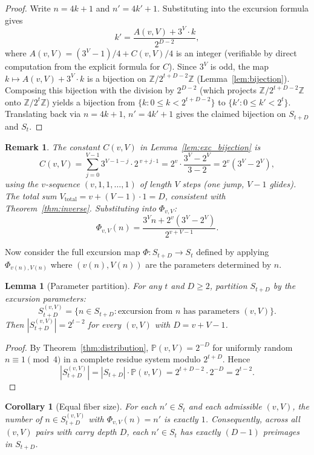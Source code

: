 \documentclass[12pt,a4paper]{article}
\newtheorem{lemma}[theorem]{Lemma}
\newtheorem{corollary}[theorem]{Corollary}
\newtheorem{remark}[theorem]{Remark}
\newcommand{\Prob}{\mathbb{P}}
\newcommand{\Z}{\mathbb{Z}}
\begin{document}
\begin{proof}
Write $n = 4k+1$ and $n' = 4k'+1$. Substituting into the excursion formula gives
\[
k' = \frac{A(v,V) + 3^V \cdot k}{2^{D-2}},
\]
where $A(v,V) = (3^V -1)/4 + C(v,V)/4$ is an integer (verifiable by direct computation from the explicit formula for $C$). Since $3^V$ is odd, the map $k \mapsto A(v,V) + 3^V \cdot k$ is a bijection on $\Z/2^{t+D-2}\Z$ (Lemma~\ref{lem:bijection}). Composing this bijection with the division by $2^{D-2}$ (which projects $\Z/2^{t+D-2}\Z$ onto $\Z/2^t\Z$) yields a bijection from $\{k: 0 \le k < 2^{t+D-2}\}$ to $\{k': 0 \le k' < 2^t\}$. Translating back via $n = 4k+1$, $n' = 4k'+1$ gives the claimed bijection on $S_{t+D}$ and $S_t$.
\end{proof}

\begin{remark}
The constant $C(v,V)$ in Lemma~\ref{lem:exc_bijection} is
\[
C(v,V) = \sum_{j=0}^{V-1} 3^{V-1-j} \cdot 2^{\,v + j\cdot 1} = 2^v \cdot \frac{3^V - 2^V}{3 - 2} = 2^v(3^V - 2^V),
\]
using the $v$-sequence $(v,1,1,\ldots,1)$ of length $V$ steps (one jump, $V-1$ glides). The total sum $V_{\text{total}} = v + (V-1)\cdot 1 = D$, consistent with Theorem~\ref{thm:inverse}. Substituting into $\Phi_{v,V}$:
\[
\Phi_{v,V}(n) = \frac{3^V n + 2^v(3^V - 2^V)}{2^{v+V-1}}.
\]
\end{remark}

Now consider the full excursion map $\Phi: S_{t+D} \to S_t$ defined by applying $\Phi_{v(n),V(n)}$ where $(v(n),V(n))$ are the parameters determined by $n$.

\begin{lemma}[Parameter partition]\label{lem:param_partition}
For any $t$ and $D \ge 2$, partition $S_{t+D}$ by the excursion parameters:
\[
S_{t+D}^{(v,V)} = \{n \in S_{t+D} : \text{excursion from $n$ has parameters } (v,V)\}.
\]
Then $|S_{t+D}^{(v,V)}| = 2^{t-2}$ for every $(v,V)$ with $D = v+V-1$.
\end{lemma}

\begin{proof}
By Theorem~\ref{thm:distribution}, $\Prob(v,V) = 2^{-D}$ for uniformly random $n \equiv 1 \pmod 4$ in a complete residue system modulo $2^{t+D}$. Hence
\[
|S_{t+D}^{(v,V)}| = |S_{t+D}| \cdot \Prob(v,V) = 2^{t+D-2} \cdot 2^{-D} = 2^{t-2}.
\]
\end{proof}

\begin{corollary}[Equal fiber size]\label{cor:fiber}
For each $n' \in S_t$ and each admissible $(v,V)$, the number of $n \in S_{t+D}^{(v,V)}$ with $\Phi_{v,V}(n) = n'$ is exactly $1$. Consequently, across all $(v,V)$ pairs with carry depth $D$, each $n' \in S_t$ has exactly $(D-1)$ preimages in $S_{t+D}$.
\end{corollary}
\end{document}
